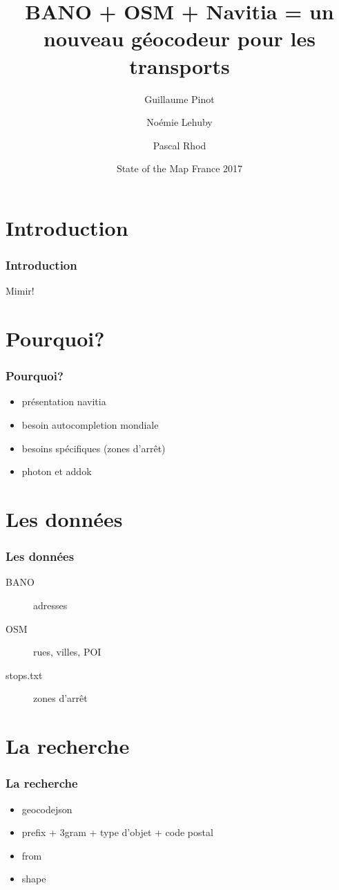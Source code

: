 \documentclass[table]{beamer}
\title[BANO + OSM + Navitia]{BANO + OSM + Navitia = un nouveau géocodeur pour les transports}
\author{Guillaume Pinot \and Noémie Lehuby \and Pascal Rhod}
\institute[Kisio Digital] %
{
  Kisio Digital\\
  20 rue Hector Malot\\
  75012 Paris, France}
\date{State of the Map France 2017}
\begin{document}
\begin{frame}
  \titlepage
\end{frame}

\section{Introduction}

\begin{frame}
  \frametitle{Introduction}

  Mimir!
\end{frame}

\section{Pourquoi?}

\begin{frame}
  \frametitle{Pourquoi?}

  \begin{itemize}
  \item présentation navitia
  \item besoin autocompletion mondiale
  \item besoins spécifiques (zones d'arrêt)
  \item photon et addok
  \end{itemize}
\end{frame}

\section{Les données}

\begin{frame}
  \frametitle{Les données}

  \begin{description}
  \item[BANO] adresses
  \item[OSM] rues, villes, POI
  \item[stops.txt] zones d'arrêt
  \end{description}
\end{frame}

\section{La recherche}

\begin{frame}
  \frametitle{La recherche}

  \begin{itemize}
  \item geocodejson
  \item prefix + 3gram + type d'objet + code postal
  \item from
  \item shape
  \end{itemize}
\end{frame}
\end{document}
